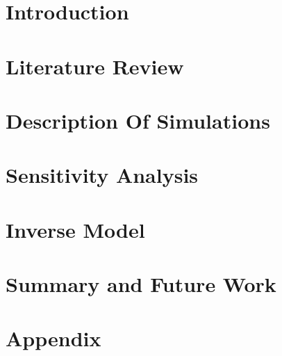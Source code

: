 \documentclass[MTech]{iitmdiss}
\begin{document}
\acknowledgements


\abstract

\pagebreak


\begin{singlespace}
\tableofcontents
\thispagestyle{empty}

\listoftables
{}
\listoffigures
{}
\end{singlespace}

\pagebreak


%
%
\chapter{Introduction}



\chapter{Literature Review}

\chapter{Description Of Simulations}

\chapter{Sensitivity Analysis}

\chapter{Inverse Model}

\chapter{Summary and Future Work}

\appendix
\chapter{Appendix}

\end{document}
